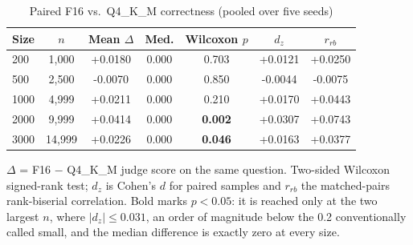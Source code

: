 \begin{table}[t]
\centering
\caption{Paired F16 vs.\ Q4\_K\_M correctness (pooled over five seeds)}
\label{tab:paired}
\footnotesize
\setlength{\tabcolsep}{3pt}
\begin{tabular}{lcccccc}
\toprule
\textbf{Size} & $n$ & \textbf{Mean $\Delta$} & \textbf{Med.} & \textbf{Wilcoxon $p$} & \textbf{$d_z$} & \textbf{$r_{rb}$} \\
\midrule
200 & 1{,}000 & +0.0180 & 0.000 & 0.703 & +0.0121 & +0.0250 \\
\rowcolor{gray!10}500 & 2{,}500 & -0.0070 & 0.000 & 0.850 & -0.0044 & -0.0075 \\
1000 & 4{,}999 & +0.0211 & 0.000 & 0.210 & +0.0170 & +0.0443 \\
\rowcolor{gray!10}2000 & 9{,}999 & +0.0414 & 0.000 & \textbf{0.002} & +0.0307 & +0.0743 \\
3000 & 14{,}999 & +0.0226 & 0.000 & \textbf{0.046} & +0.0163 & +0.0377 \\
\bottomrule
\end{tabular}
\parbox[t]{0.485\textwidth}{\vspace{0.1cm}$\Delta$ = F16 $-$ Q4\_K\_M judge score on the same question. Two-sided Wilcoxon signed-rank test; $d_z$ is Cohen's $d$ for paired samples and $r_{rb}$ the matched-pairs rank-biserial correlation. Bold marks $p < 0.05$: it is reached only at the two largest $n$, where $|d_z| \leq 0.031$, an order of magnitude below the 0.2 conventionally called small, and the median difference is exactly zero at every size.}
\end{table}
